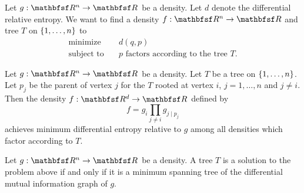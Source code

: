 
Let $g: \R^n \to \R$ be a density.
Let $d$ denote the differential
relative entropy.  We want to find a density $f: \R^n \to \R$
and tree $T$ on
$\{1, \dots, n\}$ to
\[
  \begin{aligned}
    \text{minimize}   &\quad d(q, p) \\
    \text{subject to} &\quad p \text{ factors according to the tree } T.
  \end{aligned}
\]


\begin{prop}
  Let $g: \R^n \to \R$ be a density.
  Let $T$ be
  a tree on $\{1, \dots, n\}$.
  Let $p_j$ be
  the parent of vertex $j$ for the $T$ rooted
  at vertex $i$, $j = 1,\dots,n$ and $j \neq i$.
  Then the density $f: \R^d \to \R$ defined by
  \[
    f = g_i \prod_{j \neq i} g_{j \mid p_j}
  \]
  achieves minimum differential entropy relative to $g$ among
  all densities which factor according to $T$.
\end{prop}

\begin{prop}
  Let $g: \R^n \to \R$ be a density.
  A tree $T$ is a solution to the problem above
  if and only if it is a minimum spanning
  tree of the differential mutual information graph of $g$.
\end{prop}
\strats
